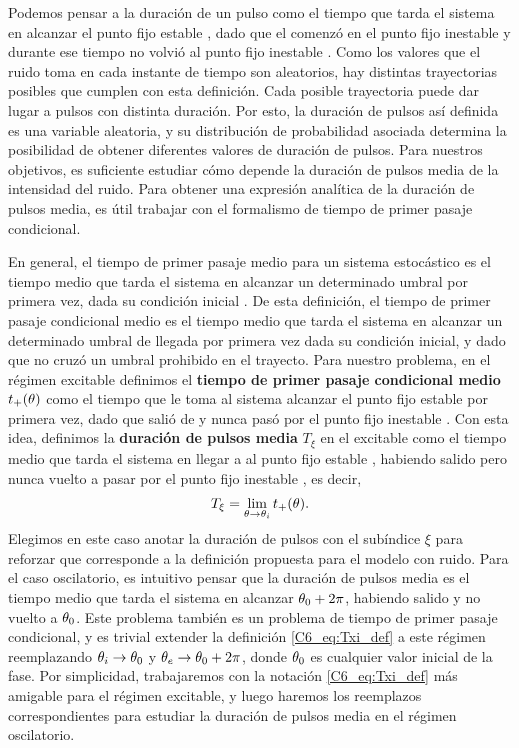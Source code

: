 \documentclass[./main.tex]{subfiles}
\begin{document}
Podemos pensar a la duración de un pulso como el tiempo que tarda el sistema en alcanzar el punto fijo estable \xxe, dado que el comenzó en el punto fijo inestable \xxi y durante ese tiempo no volvió al punto fijo inestable \xxi. Como los valores que el ruido toma en cada instante de tiempo son aleatorios, hay distintas trayectorias posibles que cumplen con esta definición. Cada posible trayectoria puede dar lugar a pulsos con distinta duración. Por esto, la duración de pulsos así definida es una variable aleatoria, y su distribución de probabilidad asociada determina la posibilidad de obtener diferentes valores de duración de pulsos. Para nuestros objetivos, es suficiente estudiar cómo depende la duración de pulsos media de la intensidad del ruido. Para obtener una expresión analítica de la duración de pulsos media, es útil trabajar con el formalismo de tiempo de primer pasaje condicional. 


En general, el tiempo de primer pasaje medio para un sistema estocástico es el tiempo medio que tarda el sistema en alcanzar un determinado umbral por primera vez, dada su condición inicial \cite{Redner2001}. De esta definición, el tiempo de primer pasaje condicional medio es el tiempo medio que tarda el sistema en alcanzar un determinado umbral de llegada por primera vez dada su condición inicial, y dado que no cruzó un umbral prohibido en el trayecto. Para nuestro problema, en el régimen excitable definimos el \textbf{tiempo de primer pasaje condicional medio} $t_{+}(\theta)$ como el tiempo que le toma al sistema alcanzar el punto fijo estable \xxe por primera vez, dado que salió de \xx y nunca pasó por el punto fijo inestable \xxi. Con esta idea, definimos la \textbf{duración de pulsos media} $T_\xi$ en el excitable como el tiempo medio que tarda el sistema en llegar a al punto fijo estable \xxe, habiendo salido pero nunca vuelto a pasar por el punto fijo inestable \xxi, es decir,
\begin{align}
    T_\xi = \lim_{\theta \rightarrow \theta_i}t_{+}(\theta).
    \label{C6_eq:Txi_def}
\end{align}
Elegimos en este caso anotar la duración de pulsos con el subíndice $\xi$ para reforzar que corresponde a la definición propuesta para el modelo con ruido. Para el caso oscilatorio, es intuitivo pensar que la duración de pulsos media es el tiempo medio que tarda el sistema en alcanzar $\theta_0+2\pi$, habiendo salido y no vuelto a $\theta_0$. Este problema también es un problema de tiempo de primer pasaje condicional, y es trivial extender la definición \ref{C6_eq:Txi_def} a este régimen reemplazando $\theta_i \rightarrow \theta_0$ y $\theta_e \rightarrow \theta_0+2\pi$, donde $\theta_0$ es cualquier valor inicial de la fase. Por simplicidad, trabajaremos con la notación \ref{C6_eq:Txi_def} más amigable para el régimen excitable, y luego haremos los reemplazos correspondientes para estudiar la duración de pulsos media en el régimen oscilatorio. 
\end{document}
